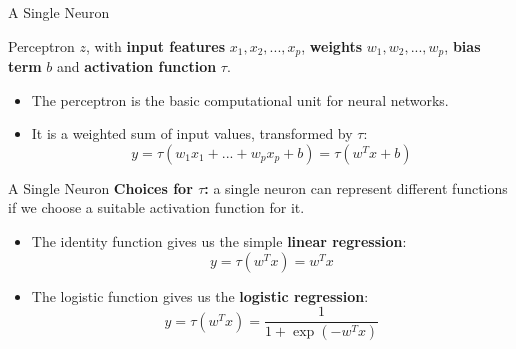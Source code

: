 \begin{vbframe} {A Single Neuron}
\begin{figure}
\centering
{}
\end{figure}
\vspace{-2mm}
\footnotesize Perceptron $z$, with \textbf{input features} $x_1, x_2, ... ,x_p$, \textbf{weights} $w_1, w_2,... ,w_p$, \textbf{bias term} $b$ and \textbf{activation function} $\tau$.
\vspace{.2cm}
\normalsize
\begin{itemize}
\item The perceptron is the basic computational unit for neural networks.
\vspace{.2cm}
\item It is a weighted sum of input values, transformed by $\tau$:
\vspace{-1mm}
$$y = \tau(w_1x_1 + ... + w_px_p +  b) = \tau(w^T x+b)$$
\end{itemize}
\end{vbframe}

\begin{vbframe}{A Single Neuron}
\textbf{Choices for $\tau$:} a single neuron can represent different functions if we choose a suitable activation function for it.
\vspace{.5cm}
\begin{itemize}
\item The identity function gives us the simple \textbf{linear regression}:
$$y = \tau(w^T x) = w^T x$$
\vspace{.5cm}
\item The logistic function gives us the \textbf{logistic regression}:
$$y = \tau(w^T x) = \frac{1}{1 + \exp(-w^T x)}$$
\end{itemize}
\end{vbframe}

